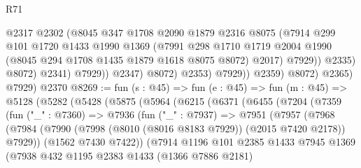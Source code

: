 \begin{lexlean}{R71}
\begin{coremodule}
                                @2317
                                @2302
                                (@8045
                                  @347
                                  @1708
                                  @2090
                                  @1879
                                  @2316
                                  @8075
                                  (@7914
                                    @299
                                    @101
                                    @1720
                                    @1433
                                    @1990
                                    @1369
                                    (@7991
                                      @298
                                      @1710
                                      @1719
                                      @2004
                                      @1990
                                      (@8045 @294 @1708 @1435 @1879 @1618 @8075 @8072)
                                      @2017)
                                    @7929))
                                @2335)
                              @8072)
                            @2341)
                          @7929))
                      @2347)
                    @8072)
                  @2353)
                @7929))
            @2359)
          @8072)
        @2365)
      @7929)
    @2370
@8269 := fun (s : @45) =>
  fun (e : @45) =>
  fun (m : @45) =>
  @5128
    (@5282
      (@5428
        (@5875
          (@5964
            (@6215
              (@6371
                (@6455
                  (@7204
                    (@7359
                      (fun ("_" : @7360) =>
                      @7936
                        (fun ("_" : @7937) =>
                        @7951
                          (@7957
                            (@7968
                              (@7984
                                (@7990
                                  (@7998 (@8010 (@8016 @8183 @7929)) (@2015 @7420 @2178))
                                  @7929))
                              (@1562 @7430 @7422))
                            (@7914
                              @1196
                              @101
                              @2385
                              @1433
                              @7945
                              @1369
                              (@7938
                                @432
                                @1195
                                @2383
                                @1433
                                (@1366 @7886 @2181)

\end{coremodule}
\end{lexlean}
